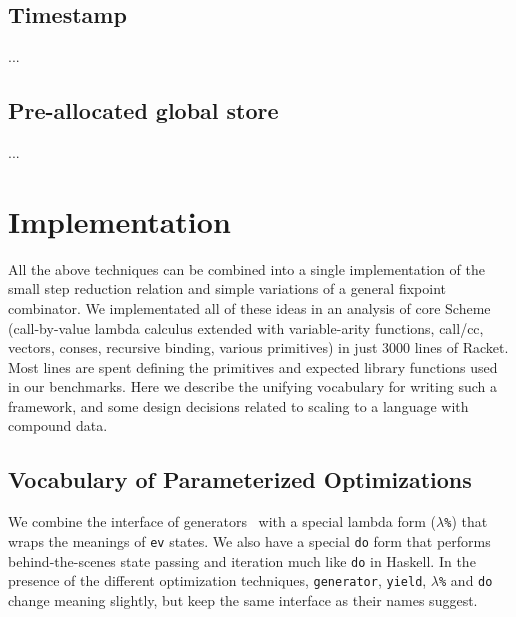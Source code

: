 \documentclass[preprint,onecolumn,9pt]{sigplanconf} %
\begin{document}
\subsection{Timestamp}
...
\subsection{Pre-allocated global store}
...

\section{Implementation}

All the above techniques can be combined into a single implementation
of the small step reduction relation and simple variations of a
general fixpoint combinator. We implementated all of these ideas in an
analysis of core Scheme (call-by-value lambda calculus extended with
variable-arity functions, call/cc, vectors, conses, recursive binding,
various primitives) in just 3000 lines of Racket. Most lines are spent
defining the primitives and expected library functions used in our
benchmarks. Here we describe the unifying vocabulary for writing such
a framework, and some design decisions related to scaling to a
language with compound data.

\subsection{Vocabulary of Parameterized Optimizations}

We combine the interface of generators~\cite{ianjohnson:cluhistory}
with a special lambda form ({\tt $\lambda$\%}) that wraps the meanings
of {\tt ev} states. We also have a special {\tt do} form that performs
behind-the-scenes state passing and iteration much like {\tt do} in
Haskell. In the presence of the different optimization
techniques, {\tt generator}, {\tt yield}, {\tt $\lambda$\%} and {\tt do}
change meaning slightly, but keep the same interface as their names
suggest.
\end{document}

